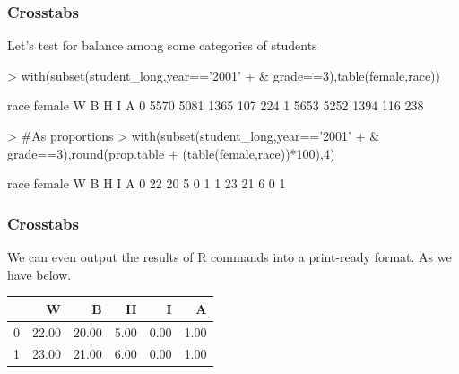 \documentclass[12pt,handout]{beamer}
\begin{document}


  
\begin{frame}[containsverbatim]
\frametitle{Crosstabs}
Let's test for balance among some categories of students 
\begin{Schunk}
\begin{Sinput}
> with(subset(student_long,year=='2001' 
+             & grade==3),table(female,race))
\end{Sinput}
\begin{Soutput}
      race
female    W    B    H    I    A
     0 5570 5081 1365  107  224
     1 5653 5252 1394  116  238
\end{Soutput}
\end{Schunk}
\begin{Schunk}
\begin{Sinput}
> #As proportions
> with(subset(student_long,year=='2001' 
+             & grade==3),round(prop.table
+             (table(female,race))*100),4)
\end{Sinput}
\begin{Soutput}
      race
female  W  B  H  I  A
     0 22 20  5  0  1
     1 23 21  6  0  1
\end{Soutput}
\end{Schunk}
\end{frame}

\begin{frame}
\frametitle{Crosstabs}
We can even output the results of R commands into a print-ready format. As we have below.
\begin{table}[ht]
\begin{center}
\begin{tabular}{rrrrrr}
  \hline
 & W & B & H & I & A \\ 
  \hline
0 & 22.00 & 20.00 & 5.00 & 0.00 & 1.00 \\ 
  1 & 23.00 & 21.00 & 6.00 & 0.00 & 1.00 \\ 
   \hline
\end{tabular}
\end{center}
\end{table}\end{frame}
\end{document}
